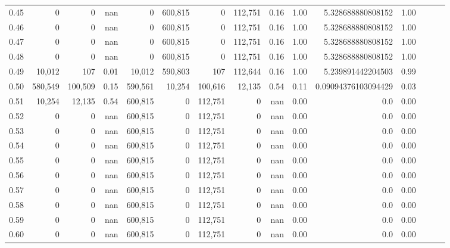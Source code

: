 \begin{tabular}{rrrrrrrrrrrrrrr}
0.45 &        0 &        0 &   nan &        0 &  600,815 &        0 &  112,751 &  0.16 &  1.00 &    5.328688880808152 &      1.00 \\
0.46 &        0 &        0 &   nan &        0 &  600,815 &        0 &  112,751 &  0.16 &  1.00 &    5.328688880808152 &      1.00 \\
0.47 &        0 &        0 &   nan &        0 &  600,815 &        0 &  112,751 &  0.16 &  1.00 &    5.328688880808152 &      1.00 \\
0.48 &        0 &        0 &   nan &        0 &  600,815 &        0 &  112,751 &  0.16 &  1.00 &    5.328688880808152 &      1.00 \\
0.49 &   10,012 &      107 &  0.01 &   10,012 &  590,803 &      107 &  112,644 &  0.16 &  1.00 &    5.239891442204503 &      0.99 \\
0.50 &  580,549 &  100,509 &  0.15 &  590,561 &   10,254 &  100,616 &   12,135 &  0.54 &  0.11 &  0.09094376103094429 &      0.03 \\
0.51 &   10,254 &   12,135 &  0.54 &  600,815 &        0 &  112,751 &        0 &   nan &  0.00 &                  0.0 &      0.00 \\
0.52 &        0 &        0 &   nan &  600,815 &        0 &  112,751 &        0 &   nan &  0.00 &                  0.0 &      0.00 \\
0.53 &        0 &        0 &   nan &  600,815 &        0 &  112,751 &        0 &   nan &  0.00 &                  0.0 &      0.00 \\
0.54 &        0 &        0 &   nan &  600,815 &        0 &  112,751 &        0 &   nan &  0.00 &                  0.0 &      0.00 \\
0.55 &        0 &        0 &   nan &  600,815 &        0 &  112,751 &        0 &   nan &  0.00 &                  0.0 &      0.00 \\
0.56 &        0 &        0 &   nan &  600,815 &        0 &  112,751 &        0 &   nan &  0.00 &                  0.0 &      0.00 \\
0.57 &        0 &        0 &   nan &  600,815 &        0 &  112,751 &        0 &   nan &  0.00 &                  0.0 &      0.00 \\
0.58 &        0 &        0 &   nan &  600,815 &        0 &  112,751 &        0 &   nan &  0.00 &                  0.0 &      0.00 \\
0.59 &        0 &        0 &   nan &  600,815 &        0 &  112,751 &        0 &   nan &  0.00 &                  0.0 &      0.00 \\
0.60 &        0 &        0 &   nan &  600,815 &        0 &  112,751 &        0 &   nan &  0.00 &                  0.0 &      0.00 \\

\end{tabular}
